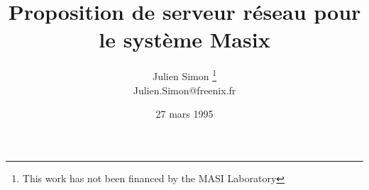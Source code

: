 
\title {\bf Proposition de serveur r\'eseau pour le syst\`eme Masix}
\author { Julien Simon
	\thanks {This work has not been financed by the MASI Laboratory}
	\\Julien.Simon@freenix.fr}
\date{ 27 mars 1995}

\maketitle

\newcommand {\figps} [4]
{
    \begin {figure} [htbp]
        \begin {center}
                \leavevmode
                \epsfxsize=#2
                \epsfysize=#3
                \epsfbox {#1.ps}
        \end {center}
        \caption {#4}
        \label {fig:#1}
    \end {figure}
}

